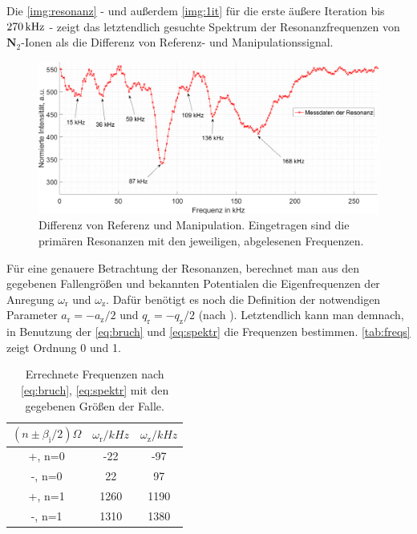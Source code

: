 \documentclass[numbers=noenddot,a4paper,notitlepage,twoside,BCOR15mm]{scrartcl}
\newcommand{\ix}[1]{_\text{#1}}
\newcommand{\fett}[1]{\textbf{#1}}
\begin{document}
			Die \autoref{img:resonanz} - und außerdem \autoref{img:1it} für die erste äußere Iteration bis $\unit[270]{kHz}$ - zeigt das letztendlich gesuchte Spektrum der Resonanzfrequenzen von $\fett{N}_2$-Ionen als die Differenz von Referenz- und Manipulationssignal.

				\begin{figure}[H]
					\includegraphics[width=\textwidth]{freq_resonanz.png}
					\caption{Differenz von Referenz und Manipulation.  Eingetragen sind die primären Resonanzen mit den jeweiligen, abgelesenen Frequenzen.}\label{img:resonanz}
				\end{figure}


			Für eine genauere Betrachtung der Resonanzen, berechnet man aus den gegebenen Fallengrößen und bekannten Potentialen die Eigenfrequenzen der Anregung $\omega\ix{r}$ und $\omega\ix{z}$. Dafür benötigt es noch die Definition der notwendigen Parameter $a\ix{r}=-a\ix{z}/2$ und $q\ix{r}=-q\ix{z}/2$ (nach \cite{Paul-FalleREF}). Letztendlich kann man demnach, in Benutzung der \autoref{eq:bruch} und \autoref{eq:spektr} die  Frequenzen bestimmen. \autoref{tab:freqs} zeigt Ordnung 0 und 1.

				\begin{table}[H]
					\centering
					\begin{tabular}{c|c|c}
						\hline $(n\pm\beta\ix{i}/2)\Omega$ & $\omega\ix{r}/\unit{kHz}$ & $\omega\ix{z}/\unit{kHz}$\\
						\hline\hline +, n=0 & -22 & -97 \\
						\hline  -, n=0 & 22 & 97 \\
						\hline +, n=1 & 1260 & 1190 \\
						\hline -, n=1 & 1310 & 1380
					\end{tabular}
					\caption{Errechnete Frequenzen nach \autoref{eq:bruch}, \autoref{eq:spektr} mit den gegebenen Größen der Falle.}
					\label{tab:freqs}
				\end{table}
\end{document}
